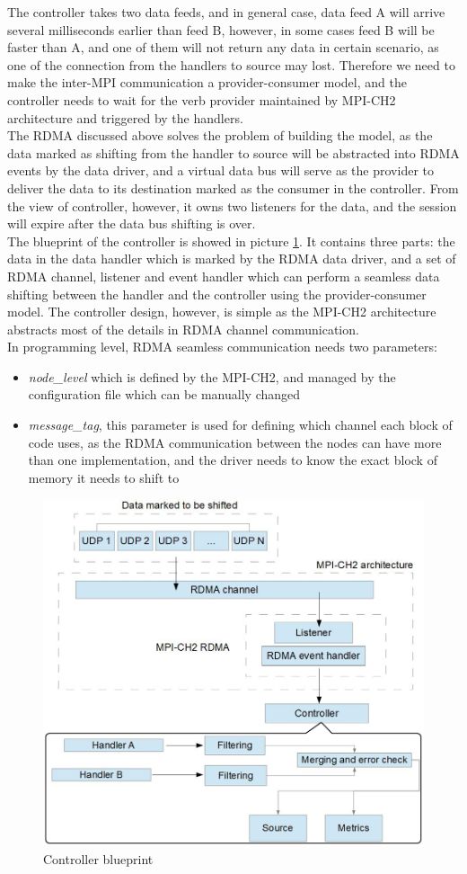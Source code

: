 \documentclass[11pt,openright,a4paper]{report}
\begin{document}
The controller takes two data feeds, and in general case, data feed A will arrive several milliseconds earlier than feed B, however, in some cases feed B will be faster than A, and one of them will not return any data in certain scenario, as one of the connection from the handlers to source may lost. Therefore we need to make the inter-MPI communication a provider-consumer model, and the controller needs to wait for the verb provider maintained by MPI-CH2 architecture and triggered by the handlers.\\
The RDMA discussed above solves the problem of building the model, as the data marked as shifting from the handler to source will be abstracted into RDMA events by the data driver, and a virtual data bus will serve as the provider to deliver the data to its destination marked as the consumer in the controller. From the view of controller, however, it owns two listeners for the data, and the session will expire after the data bus shifting is over. \\
The blueprint of the controller is showed in picture \ref{fig:controllerBlueprint}. It contains three parts: the data in the data handler which is marked by the RDMA data driver, and a set of RDMA channel, listener and event handler which can perform a seamless data shifting between the handler and the controller using the provider-consumer model. The controller design, however, is simple as the MPI-CH2 architecture abstracts most of the details in RDMA channel communication.\\
In programming level, RDMA seamless communication needs two parameters:
\begin{itemize}
	\item \textit{node\_level} which is defined by the MPI-CH2, and managed by the configuration file which can be manually changed
	\item \textit{message\_tag}, this parameter is used for defining which channel each block of code uses, as the RDMA communication between the nodes can have more than one implementation, and the driver needs to know the exact block of memory it needs to shift to
\end{itemize}
\begin{figure}[H]
\centering
\includegraphics[width=0.7\linewidth]{picture/controllerBlueprint}
\caption{Controller blueprint}
\label{fig:controllerBlueprint}
\end{figure}
\end{document}
